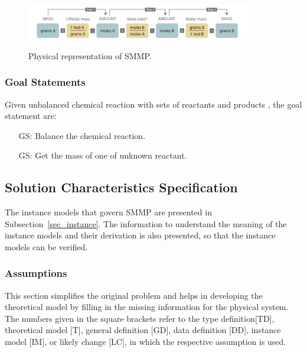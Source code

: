 \documentclass[12pt]{article}
\newcounter{goalnum} %
\begin{document}
 \begin{figure}[h!]
 \begin{center}
 {
  \includegraphics[width=0.9\textwidth]{physical}
 }
 \caption{\label{ Figure 2:} Physical representation of SMMP.}
 \end{center}
 \end{figure}

\subsubsection{Goal Statements}

\noindent Given unbalanced chemical reaction with sets of reactants and products , the goal statement are:

\begin{itemize}
\item[GS\refstepcounter{goalnum}\thegoalnum \label{G1}:] Balance the chemical reaction.
\item[GS\refstepcounter{goalnum}\thegoalnum \label{G2}:] Get the mass of one of unknown reactant.
\end{itemize}

\subsection{Solution Characteristics Specification}


The instance models that govern SMMP are presented in
Subsection~\ref{sec_instance}.  The information to understand the meaning of the
instance models and their derivation is also presented, so that the instance
models can be verified.

\subsubsection{Assumptions} \label{sec_assumpt}

This section simplifies the original problem and helps in developing the
theoretical model by filling in the missing information for the physical
system. The numbers given in the square brackets refer to the  type definition[TD], theoretical model
[T], general definition [GD], data definition [DD], instance model [IM], or
likely change [LC], in which the respective assumption is used.
\end{document}
